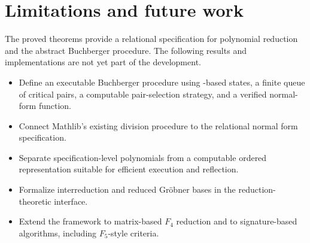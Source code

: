 \section{Limitations and future work}\label{sec:future-work}

The proved theorems provide a relational specification for polynomial reduction and the abstract Buchberger procedure.  The following results and implementations are not yet part of the development.
\begin{itemize}[leftmargin=2em]
  \item Define an executable Buchberger procedure using -based
    states, a finite queue of critical pairs, a computable pair-selection
    strategy, and a verified normal-form function.
  \item Connect Mathlib's existing division procedure to the relational normal
    form specification.
  \item Separate specification-level polynomials from a computable ordered
    representation suitable for efficient execution and reflection.
  \item Formalize interreduction and reduced Gr\"obner bases in the
    reduction-theoretic interface.
  \item Extend the framework to matrix-based $F_4$ reduction and to
    signature-based algorithms, including $F_5$-style criteria.
\end{itemize}
